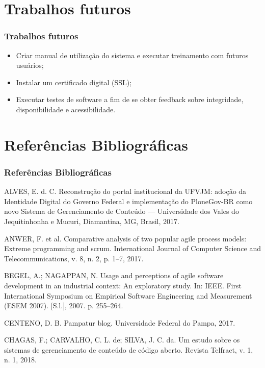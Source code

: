 \documentclass[xcolor=table]{beamer}
\begin{document}
\section{Trabalhos futuros}
\begin{frame}
    \frametitle{Trabalhos futuros}
    \begin{itemize}
        \item Criar manual de utilização do sistema e executar treinamento com futuros usuários;
        \item Instalar um certificado digital (SSL); %
        \item Executar testes de software a fim de se obter feedback sobre integridade, disponibilidade e acessibilidade. %
    \end{itemize}

    
\end{frame}

    

\section{Referências Bibliográficas}

\begin{frame}
    \frametitle{Referências Bibliográficas}
    \scriptsize{
        ALVES, E. d. C. Reconstrução do portal institucional da UFVJM: adoção da Identidade Digital do Governo Federal e implementação do PloneGov-BR como novo Sistema de Gerenciamento de Conteúdo — Universidade dos Vales do Jequitinhonha e Mucuri, Diamantina, MG, Brasil, 2017. \newline

        ANWER, F. et al. Comparative analysis of two popular agile process models: Extreme programming and scrum. International Journal of Computer Science and Telecommunications, v. 8, n. 2, p. 1–7, 2017. \newline

        BEGEL, A.; NAGAPPAN, N. Usage and perceptions of agile software development in an industrial context: An exploratory study. In: IEEE. First International Symposium on Empirical Software Engineering and Measurement (ESEM 2007). [S.l.], 2007. p. 255–264. \newline

        CENTENO, D. B. Pampatur blog. Universidade Federal do Pampa, 2017. \newline
        
        CHAGAS, F.; CARVALHO, C. L. de; SILVA, J. C. da. Um estudo sobre os sistemas de gerenciamento de conteúdo de código aberto. Revista Telfract, v. 1, n. 1, 2018. \newline
}
\end{frame}
\end{document}

